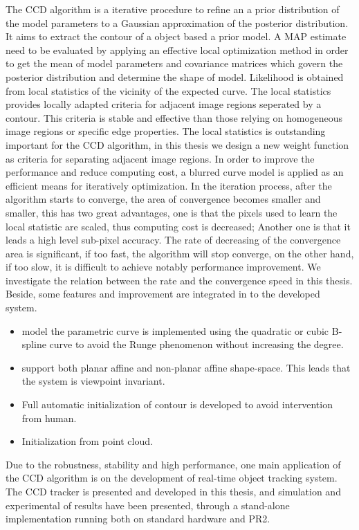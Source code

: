 The CCD algorithm is a iterative procedure to refine an
a prior distribution of the model parameters to a Gaussian
approximation of the posterior distribution. It aims to extract the
contour of a object based a prior model. A MAP estimate need to be
evaluated by applying an effective local optimization method in order to get
the mean of model parameters and covariance matrices which govern the
posterior distribution and determine the shape of model. Likelihood is 
obtained from local statistics of the vicinity of the expected
curve. The local statistics provides locally adapted criteria for
adjacent image regions seperated by a contour. This criteria is stable
and effective than those relying on homogeneous image regions or
specific edge properties. The local statistics is outstanding
important for the CCD algorithm, in this thesis we design a new weight
function as criteria for separating adjacent image regions. 
 In order to improve the performance and
reduce computing cost, a blurred curve model
\cite{hanek2004contracting} is applied as an efficient means for
iteratively optimization. In the iteration process, after the
algorithm starts to converge, the area of
convergence becomes smaller and smaller, this has two great
advantages, one is that the pixels used to learn the local statistic
are scaled, thus computing cost is decreased; Another one is that it
leads a high level sub-pixel accuracy. The rate of decreasing of the
convergence area is significant, if too fast, the algorithm will stop
converge, on the other hand, if too slow, it is difficult to achieve
notably performance improvement. We investigate the relation between
the rate and the convergence speed in this thesis.
Beside, some features and improvement are integrated in to the
developed system.
\begin{itemize}
\item model the parametric curve is implemented using the quadratic or
cubic B-spline curve  to avoid the Runge phenomenon without increasing
the degree.
\item support both planar affine and non-planar affine
  shape-space. This leads that the system is viewpoint invariant.
\item Full automatic initialization of contour is developed to avoid
  intervention from human.
\item Initialization from point cloud.
\end{itemize}

Due to the robustness, stability and high performance, one main
application of the CCD algorithm is on the development of real-time
object tracking system. The CCD tracker is presented and developed in
this thesis, and simulation and experimental of results have been presented, through a
stand-alone implementation running both on
standard hardware and PR2.

